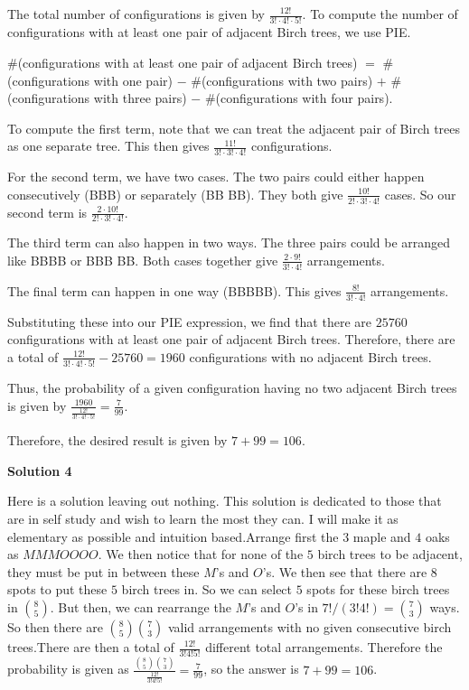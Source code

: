 \begin{enumerate}
 The total number of configurations is given by $\frac{12!}{3! \cdot 4! \cdot 5!}$. To compute the number of configurations with at least one pair of adjacent Birch trees, we use PIE.

 $\#$(configurations with at least one pair of adjacent Birch trees) $=$ $\#$(configurations with one pair) $-$ $\#$(configurations with two pairs) $+$ $\#$(configurations with three pairs) $-$ $\#$(configurations with four pairs).

 To compute the first term, note that we can treat the adjacent pair of Birch trees as one separate tree. This then gives $\frac{11!}{3! \cdot 3! \cdot 4!}$ configurations. 

 For the second term, we have two cases. The two pairs could either happen consecutively (BBB) or separately (BB BB). They both give $\frac{10!}{2! \cdot 3! \cdot 4!}$ cases. So our second term is $\frac{2 \cdot 10!}{2! \cdot 3! \cdot 4!}$.

 The third term can also happen in two ways. The three pairs could be arranged like BBBB or BBB BB. Both cases together give $\frac{2 \cdot 9!}{3! \cdot 4!}$ arrangements.

 The final term can happen in one way (BBBBB). This gives $\frac{8!}{3! \cdot 4!}$ arrangements.

 Substituting these into our PIE expression, we find that there are $25760$ configurations with at least one pair of adjacent Birch trees. Therefore, there are a total of $\frac{12!}{3! \cdot 4! \cdot 5!} - 25760 = 1960$ configurations with no adjacent Birch trees.

 Thus, the probability of a given configuration having no two adjacent Birch trees is given by $\frac{1960}{\frac{12!}{3! \cdot 4! \cdot 5!}} = \frac{7}{99}$.

 
Therefore, the desired result is given by $7+99 = \boxed{106}$.

 



\textbf{Solution 4}

Here is a solution leaving out nothing. This solution is dedicated to those that are in self study and wish to learn the most they can. I will make it as elementary as possible and intuition based.Arrange first the $3$ maple and $4$ oaks as $MMMOOOO$. We then notice that for none of the $5$ birch trees to be adjacent, they must be put in between these $M$'s and $O$'s. We then see that there are $8$ spots to put these $5$ birch trees in. So we can select $5$ spots for these birch trees in $\binom{8}{5}$. But then, we can rearrange the $M$'s and $O$'s in $7!/(3!4!)=\binom{7}{3}$ ways. So then there are $\binom{8}{5}\binom{7}{3}$ valid arrangements with no given consecutive birch trees.There are then a total of $\frac{12!}{3!4!5!}$ different total arrangements. Therefore the probability is given as $\frac{\binom{8}{5}\binom{7}{3}}{\frac{12!}{3!4!5!}}=\frac{7}{99}$, so the answer is $7+99=\boxed{106}$.


\end{enumerate}
